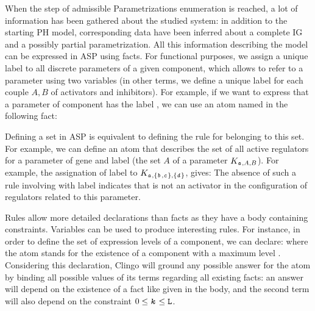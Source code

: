 When the step of admissible Parametrizations enumeration is reached, a lot of information has been gathered about the studied system: in addition to the starting PH model, corresponding data have been inferred about a complete IG and a possibly partial parametrization.
All this information describing the model can be expressed in ASP using facts.
For functional purposes, we assign a unique label to all discrete parameters of a given component, which allows to refer to a parameter using two variables (in other terms, we define a unique label for each couple $A,B$ of activators and inhibitors).
For example, if we want to express that a parameter of component  has the label , we can use an atom named  in the following fact:

Defining a set in ASP is equivalent to defining the rule for belonging to this set. For example, we can define an atom  that describes the set of all active regulators for a parameter of gene  and label  (\ie the set $A$ of a parameter $K_{\texttt{\textit{a}},A,B}$). For example, the assignation of label  to $K_{\texttt{\textit{a}},\{\texttt{\textit{b}},\texttt{\textit{c}}\},\{\texttt{\textit{d}}\}}$, gives:
The absence of such a rule involving  with label  indicates that  is not an activator in the configuration of regulators related to this parameter.

Rules allow more detailed declarations than facts as they have a body containing constraints. Variables can be used to produce interesting rules.
For instance, in order to define the set of expression levels of a component, we can declare:
where the  atom stands for the existence of a component  with a maximum level .
Considering this declaration, Clingo will ground any possible answer for the atom  by binding all possible values of its terms regarding all existing facts: an answer  will depend on the existence of a fact like given in the body, and the second term will also depend on the constraint $0 \leq \texttt{\textit{k}} \leq \texttt{L}$.

